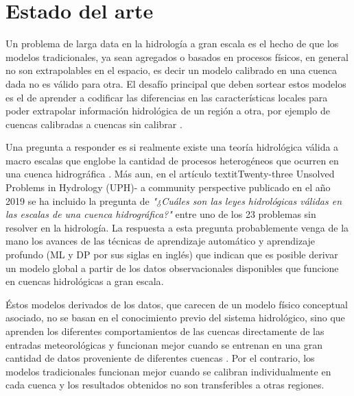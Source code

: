 \section{Estado del arte}

Un problema de larga data en la hidrología a gran escala es el hecho de que los modelos tradicionales, ya sean agregados o basados 
en procesos físicos, en general no son extrapolables en el espacio, es decir un modelo calibrado en una cuenca dada no es 
válido para otra. El desafío principal que deben sortear estos modelos es el de aprender a codificar las diferencias 
en las características locales para poder extrapolar información hidrológica 
de un región a otra, por ejemplo de cuencas calibradas a cuencas sin calibrar 
\cite{Bloschl2} \cite{Razavi} \cite{Hrachowitz} \cite{Bloschl3}.   

Una pregunta a responder es si realmente existe una teoría hidrológica válida a macro escalas que englobe la cantidad de 
procesos heterogéneos que ocurren en una cuenca hidrográfica \cite{nearing}. Más aun, en el artículo textit{Twenty-three Unsolved Problems 
in Hydrology (UPH)- a community perspective} 
publicado en el año 2019 \cite{Bloschl} se ha incluido la pregunta de 
\textit{"¿Cuáles son las leyes hidrológicas válidas en las  escalas de una cuenca hidrográfica?"} 
entre uno de los 23 problemas sin resolver en la hidrología. La respuesta a esta pregunta probablemente venga de la mano
los avances de las técnicas de aprendizaje automático y aprendizaje profundo (ML y DP por sus siglas en inglés) que 
indican que es posible derivar un modelo global a partir de los datos
observacionales disponibles que funcione en cuencas hidrológicas a gran escala\cite{nearing}. 


Éstos modelos derivados de los datos, que carecen de un modelo físico conceptual asociado, no se basan en el conocimiento 
previo del sistema hidrológico, sino que aprenden los diferentes comportamientos de las cuencas directamente de 
las entradas meteorológicas y funcionan mejor cuando se entrenan en una gran cantidad de datos proveniente de diferentes cuencas 
\cite{Gupta}\cite{Peters}. 
Por el contrario, los modelos tradicionales funcionan mejor cuando se calibran individualmente en cada cuenca y los resultados 
obtenidos no son transferibles a otras regiones.  

